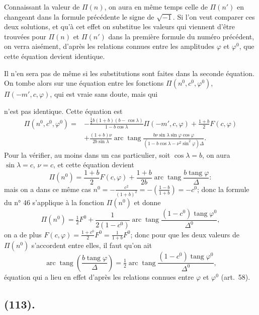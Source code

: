 \documentclass{article}
\begin{document}
Connaissant la valeur de $\Pi(n)$, on aura en même temps celle de $\Pi(n')$ en changeant dans la formule précédente le signe de $\sqrt{-1}$. Si l'on veut comparer ces deux solutions, et qu'à cet effet on substitue les valeurs qui viennent d'être trouvées pour $\Pi(n)$ et $\Pi(n')$ dans la première formule du numéro précédent, on verra aisément, d'après les relations connues entre les amplitudes $\varphi$ et $\varphi^{0}$, que cette équation devient identique.

Il n'en sera pas de même si les substitutions sont faites dans la seconde équation. On tombe alors sur une équation entre les fonctions $\Pi(n^{0},c^{0},\varphi^{0})$, $\Pi(-m',c,\varphi)$, qui est vraie sans doute, mais qui

n'est pas identique. Cette équation est
\[ \begin{aligned} \Pi(n^{0},c^{0},\varphi^{0})={}&-\frac{\tfrac{1}{2}b(1+b)(b-\cos\lambda)}{1-b\cos\lambda}\Pi(-m',c,\varphi)+\frac{1+b}{2}F(c,\varphi)\\ &+\frac{(1+b)\nu}{2b\sin\lambda}\operatorname{arc}\operatorname{tang}\frac{b\nu\sin\lambda\sin\varphi\cos\varphi}{(1-b\cos\lambda-\nu^{2}\sin^{2}\varphi)\Delta}. \end{aligned} \]
Pour la vérifier, au moins dans un cas particulier, soit $\cos\lambda=b$, on aura $\sin\lambda=c$, $\nu=c$, et cette équation devient
\[ \Pi(n^{0})=\frac{1+b}{2}F(c,\varphi)+\frac{1+b}{2b}\operatorname{arc}\operatorname{tang}\frac{b\operatorname{tang}\varphi}{\Delta}: \]
mais on a dans ce même cas $n^{0}=-\frac{c^{2}}{(1+b)^{2}}=-\left(\frac{1-b}{1+b}\right)=-c^{0}$; donc la formule du n° 46 s'applique à la fonction $\Pi(n^{0})$ et donne
\[ \Pi(n^{0})=\tfrac{1}{2}F^{0}+\frac{1}{2(1-c^{0})}\operatorname{arc}\operatorname{tang}\frac{(1-c^{0})\operatorname{tang}\varphi^{0}}{\Delta^{0}}, \]
on a de plus $F(c,\varphi)=\frac{1+c^{0}}{2}F^{0}=\frac{1}{1+b}F^{0}$; donc pour que les deux valeurs de $\Pi(n^{0})$ s'accordent entre elles, il faut qu'on ait
\[ \operatorname{arc}\operatorname{tang}\left(\frac{b\operatorname{tang}\varphi}{\Delta}\right)=\tfrac{1}{2}\operatorname{arc}\operatorname{tang}\frac{(1-c^{0})\operatorname{tang}\varphi^{0}}{\Delta^{0}}, \]
équation qui a lieu en effet d'après les relations connues entre $\varphi$ et $\varphi^{0}$ (art.\ 58).

\subsection*{(113).}
\end{document}
